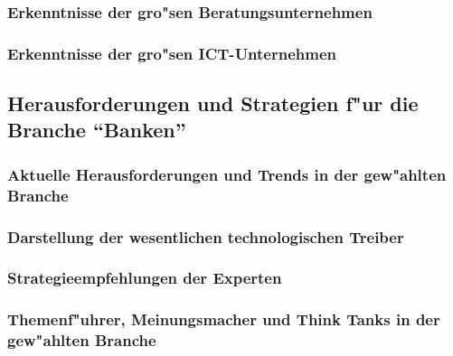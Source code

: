 \documentclass[a4paper, 12pt]{article} %
\begin{document}
\subsubsection{Erkenntnisse der gro"sen Beratungsunternehmen}


\subsubsection{Erkenntnisse der gro"sen ICT-Unternehmen}



\subsection{Herausforderungen und Strategien f"ur die Branche ``Banken''}

\subsubsection{Aktuelle Herausforderungen und Trends in der gew"ahlten Branche}


\subsubsection{Darstellung der wesentlichen technologischen Treiber}


\subsubsection{Strategieempfehlungen der Experten}


\subsubsection{Themenf"uhrer, Meinungsmacher und Think Tanks in der gew"ahlten Branche}


\end{document}
